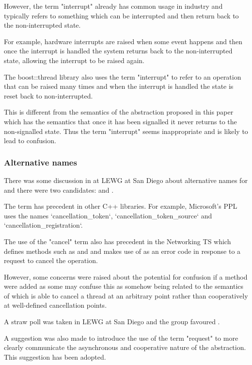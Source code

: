 However, the term "interrupt" already has common usage in industry and
typically refers to something which can be interrupted and then return
back to the non-interrupted state.

For example, hardware interrupts are raised when some event happens and then
once the interrupt is handled the system returns back to the non-interrupted
state, allowing the interrupt to be raised again.

The boost::thread library also uses the term "interrupt" to refer to an operation
that can be raised many times and when the interrupt is handled the state is
reset back to non-interrupted.

This is different from the semantics of the abstraction proposed in this paper 
which has the semantics that once it has been signalled it never returns to
the non-signalled state. Thus the term "interrupt" seems inappropriate and is
likely to lead to confusion.

\subsubsection*{Alternative names}

There was some discussion in at LEWG at San Diego about alternative names
for  and there were two candidates:
 and .

The term  has precedent in other C++ libraries.
For example, Microsoft's PPL uses the names `cancellation_token`, `cancellation_token_source`
and `cancellation_registration`.

The use of the "cancel" term also has precedent in the Networking TS which defines methods
such as  and  and makes
use of  as an error code in response to a request to
cancel the operation.

However, some concerns were raised about the potential for confusion if a 
method were added as some may confuse this as somehow being related to the semantics of
 which is able to cancel a thread at an arbitrary point rather than
cooperatively at well-defined cancellation points.

A straw poll was taken in LEWG at San Diego and the group favoured .

A suggestion was also made to introduce the use of the term "request" to more clearly
communicate the asynchronous and cooperative nature of the abstraction. This suggestion
has been adopted.

